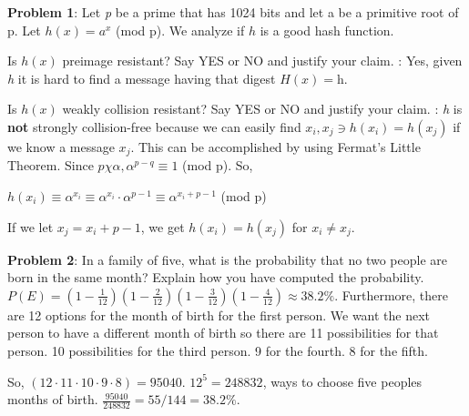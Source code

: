 \documentclass[12pt,letterpaper,final]{report}
\begin{document}

\vline


\bigskip
\noindent\textbf{Problem 1}: Let \textit{p} be a prime that has 1024 bits and let a be a primitive root of p.
\newline Let $h(x) = a^{x}$ (mod p). We analyze if $h$ is a good hash function.
\begin{alphalist}
	\item\indent Is $h(x)$ preimage resistant? Say YES or NO and justify your claim.
	\newline 
	: Yes, given \textit{h} it is hard to find a message having that digest $H(x) = \textit{h}$.
	\item\indent Is $h(x)$ weakly collision resistant? Say YES or NO and justify your claim.
	\newline
	: \textit{h} is {\bf not} strongly collision-free because we can easily find $x_{i}, x_{j} \ni h(x_{i}) = h(x_{j})$ if we know a message $x_{j}$. This can be accomplished by using Fermat's Little Theorem. Since $p   \chi\alpha, \alpha^{p-q} \equiv 1$ (mod p). So,
\begin{center} 
$h(x_{i}) \equiv \alpha^{{x}_{i} }\equiv \alpha^{{x}_{i}} \cdot \alpha^{p-1} \equiv \alpha^{{x}_{i}+{p-1}}$ (mod p)
\end{center}
If we let $x_{j} = x_{i} + p -1$, we get $h(x_{i}) = h(x_{j})$ for $x_{i} \neq x_{j}$.
\end{alphalist}

\bigskip

\noindent\textbf{Problem 2}: In a family of five, what is the probability that no two people are born in the same month? Explain how you have computed the probability. 
\newline
{} $P(E) = (1 - \frac{1}{12})(1- \frac{2}{12})(1 -\frac{3}{12})(1 - \frac{4}{12}) \approx 38.2\%$. Furthermore, there are 12 options for the month of birth for the first person. We want the next person to have a different month of birth so there are 11 possibilities for that person. 10 possibilities for the third person. 9 for the fourth. 8 for the fifth. 
\begin{center}
So, $(12 \cdot 11 \cdot 10 \cdot 9 \cdot 8) = 95040$. 
$12^{5} = 248832$, ways to choose five peoples months of birth.
$\frac{95040}{248832} = 55/144 = 38.2\%$.
\end{center}
\end{document}
